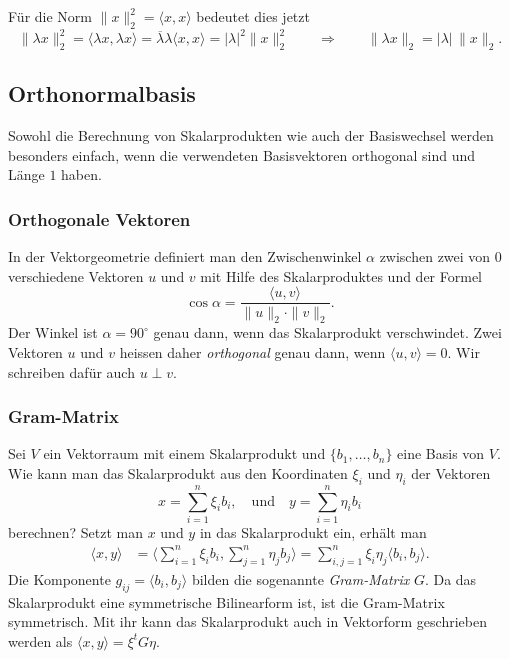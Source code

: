 Für die Norm $\|x\|_2^2=\langle x,x\rangle$ bedeutet dies jetzt
\[
\|\lambda x\|_2^2
=
\langle \lambda x,\lambda x\rangle
=
\overline{\lambda}\lambda \langle x,x\rangle
=
|\lambda|^2 \|x\|_2^2
\qquad\Rightarrow\qquad
\|\lambda x\|_2 = |\lambda|\, \|x\|_2.
\]

\subsection{Orthonormalbasis
\label{buch:subsection:orthonormalbasis}}
%
Sowohl die Berechnung von Skalarprodukten wie auch der Basiswechsel
werden besonders einfach, wenn die verwendeten Basisvektoren orthogonal
sind und Länge $1$ haben.

\subsubsection{Orthogonale Vektoren}
In der Vektorgeometrie definiert man den Zwischenwinkel $\alpha$
zwischen zwei von $0$ verschiedene Vektoren $u$ und $v$ mit Hilfe
des Skalarproduktes und der Formel
\[
\cos\alpha = \frac{\langle u,v\rangle}{\|u\|_2\cdot\|v\|_2}.
\]
Der Winkel ist $\alpha=90^\circ$ genau dann, wenn das Skalarprodukt
verschwindet.
Zwei Vektoren $u$ und $v$ heissen daher {\em orthogonal} genau dann,
wenn $\langle u,v\rangle=0$.
Wir schreiben dafür auch $u\perp v$.
%

\subsubsection{Gram-Matrix}
Sei $V$ ein Vektorraum mit einem Skalarprodukt und $\{b_1,\dots,b_n\}$ eine
Basis von $V$.
Wie kann man das Skalarprodukt aus den Koordinaten $\xi_i$ und $\eta_i$
der Vektoren 
\[
x = \sum_{i=1}^n \xi_i b_i,
\quad\text{und}\quad
y = \sum_{i=1}^n \eta_i b_i
\]
berechnen?
Setzt man $x$ und $y$ in das Skalarprodukt ein, erhält man
\begin{align}
\langle x,y\rangle
&=
\biggl\langle
\sum_{i=1}^n \xi_i b_i,
\sum_{j=1}^n \eta_j b_j
\biggr\rangle
=
\sum_{i,j=1}^n \xi_i\eta_j \langle b_i,b_j\rangle.
\label{buch:skalarprodukt:eqn:skalarproduktgram}
\end{align}
Die Komponente $g_{i\!j}=\langle b_i,b_j\rangle$ bilden die sogenannte
{\em Gram-Matrix} $G$.
%
Da das Skalarprodukt eine symmetrische Bilinearform ist, ist die
Gram-Matrix symmetrisch.
Mit ihr kann das Skalarprodukt auch in Vektorform geschrieben werden
als $\langle x,y\rangle = \xi^t G\eta$.


